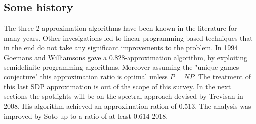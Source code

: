 \subsection{Some history}
The three 2-approximation algorithms have been known in the literature for many years.
Other invesigations led to linear programming based techniques that in the end do not take any significant improvements to the problem.
In 1994 Goemans and Williamsons gave a 0.828-approximation algorithm, by exploiting semidefinite programming algorithms. 
Moreover assuming the "unique games conjecture" this approximation ratio is optimal unless $P=NP$.
The treatment of this last SDP approximation is out of the scope of this survey. 
In the next sections the spotlights will be on the spectral approach devised by Trevisan in 2008.
His algorithm achieved an approximation ration of 0.513. The analysis was improved by Soto up to a ratio of at least 0.614 2018.